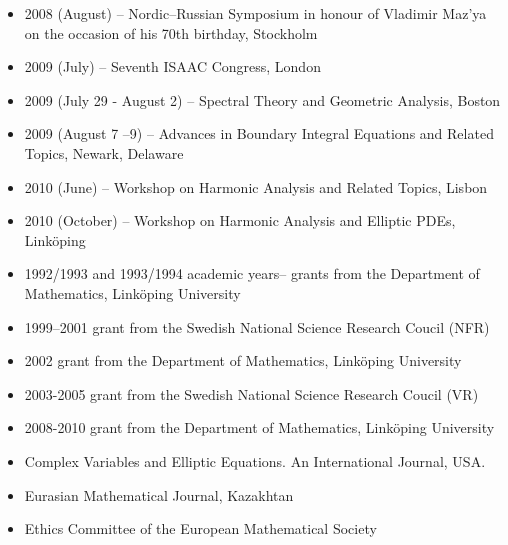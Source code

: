 \documentclass{article}
\begin{document}
\begin{itemize}
        \item 2008 (August) -- Nordic--Russian Symposium in honour of Vladimir Maz'ya on the occasion of his 70th birthday, Stockholm
         \item 2009 (July) -- Seventh ISAAC Congress, London 
       \item 2009 (July 29 - August 2)  -- Spectral Theory and Geometric Analysis, Boston 
       \item 2009 (August 7 --9) -- Advances in Boundary Integral Equations and Related Topics, Newark, Delaware 
       \item 2010 (June) -- Workshop on Harmonic Analysis and Related Topics, Lisbon
       \item 2010 (October) -- Workshop on Harmonic Analysis and Elliptic PDEs, Link\"oping
\end{itemize}

\bigskip

    \begin{itemize}
         \item 1992/1993 and 1993/1994 academic years-- grants from 
the Department of Mathematics, Link\"oping University
          \item 1999--2001 grant from the Swedish National Science 
Research Coucil (NFR)
         \item 2002 grant from the Department of Mathematics, 
Link\"oping University
         \item 2003-2005 grant from the Swedish National Science 
Research Coucil (VR)
                 \item 2008-2010 grant from the Department of Mathematics, 
Link\"oping University
     \end{itemize}


   \begin{itemize}
     \item Complex Variables and Elliptic Equations. An International Journal, USA.
     \item Eurasian Mathematical Journal, Kazakhtan
     \end{itemize}

  \begin{itemize}
     \item Ethics Committee  of the European Mathematical Society
   \end{itemize}
   
\end{document}
